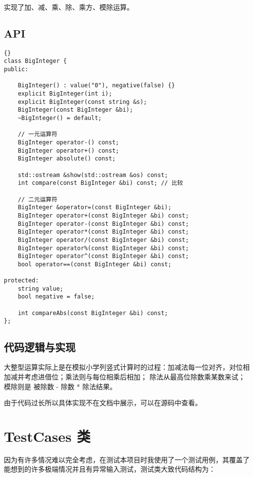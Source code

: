 实现了加、减、乘、除、乘方、模除运算。

\section{API}

{
\begin{lstlisting}[firstnumber=22, caption=BigInteger 类定义]{}
class BigInteger {
public:

    BigInteger() : value("0"), negative(false) {}
    explicit BigInteger(int i);
    explicit BigInteger(const string &s);
    BigInteger(const BigInteger &bi);
    ~BigInteger() = default;

    // 一元运算符
    BigInteger operator-() const;
    BigInteger operator+() const;
    BigInteger absolute() const;

    std::ostream &show(std::ostream &os) const;
    int compare(const BigInteger &bi) const; // 比较

    // 二元运算符
    BigInteger &operator=(const BigInteger &bi);
    BigInteger operator+(const BigInteger &bi) const;
    BigInteger operator-(const BigInteger &bi) const;
    BigInteger operator*(const BigInteger &bi) const;
    BigInteger operator/(const BigInteger &bi) const;
    BigInteger operator%(const BigInteger &bi) const;
    BigInteger operator^(const BigInteger &bi) const;
    bool operator==(const BigInteger &bi) const;

protected:
    string value;
    bool negative = false;

    int compareAbs(const BigInteger &bi) const;
};
\end{lstlisting}


\section{代码逻辑与实现}


大整型运算实际上是在模拟小学列竖式计算时的过程：加减法每一位对齐，对位相加减并考虑进借位；乘法则与每位相乘后相加；%
除法从最高位除数乘某数来试；模除则是 被除数 - 除数 * 除法结果。

由于代码过长所以具体实现不在文档中展示，可以在源码中查看。

\chapter{TestCases 类}

因为有许多情况难以完全考虑，在测试本项目时我使用了一个测试用例，其覆盖了能想到的许多极端情况并且有异常输入测试，测试类大致代码结构为：

}
